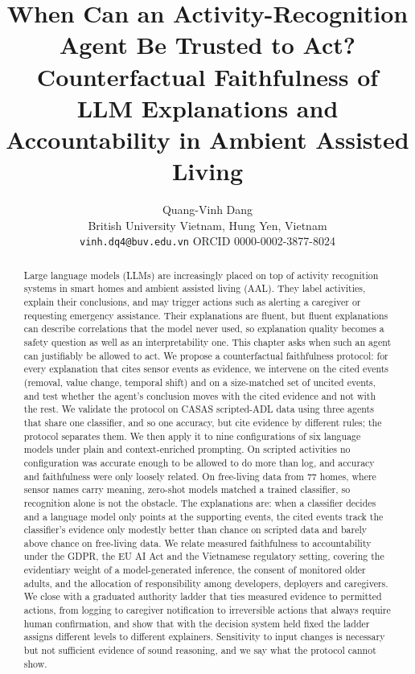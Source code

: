\documentclass[11pt,a4paper]{article}
\title{When Can an Activity-Recognition Agent Be Trusted to Act?\\
Counterfactual Faithfulness of LLM Explanations and\\
Accountability in Ambient Assisted Living}
\author{Quang-Vinh Dang\\
\small British University Vietnam, Hung Yen, Vietnam\\
\small \texttt{vinh.dq4@buv.edu.vn} \quad ORCID 0000-0002-3877-8024}
\date{}
\begin{document}
\maketitle

\begin{abstract}
Large language models (LLMs) are increasingly placed on top of activity recognition systems in smart homes and ambient assisted living (AAL). They label activities, explain their conclusions, and may trigger actions such as alerting a caregiver or requesting emergency assistance. Their explanations are fluent, but fluent explanations can describe correlations that the model never used, so explanation quality becomes a safety question as well as an interpretability one. This chapter asks when such an agent can justifiably be allowed to act. We propose a counterfactual faithfulness protocol: for every explanation that cites sensor events as evidence, we intervene on the cited events (removal, value change, temporal shift) and on a size-matched set of uncited events, and test whether the agent's conclusion moves with the cited evidence and not with the rest. We validate the protocol on CASAS scripted-ADL data using three agents that share one classifier, and so one accuracy, but cite evidence by different rules; the protocol separates them. We then apply it to nine configurations of six language models under plain and context-enriched prompting. On scripted activities no configuration was accurate enough to be allowed to do more than log, and accuracy and faithfulness were only loosely related. On free-living data from 77 homes, where sensor names carry meaning, zero-shot models matched a trained classifier, so recognition alone is not the obstacle. The explanations are: when a classifier decides and a language model only points at the supporting events, the cited events track the classifier's evidence only modestly better than chance on scripted data and barely above chance on free-living data. We relate measured faithfulness to accountability under the GDPR, the EU AI Act and the Vietnamese regulatory setting, covering the evidentiary weight of a model-generated inference, the consent of monitored older adults, and the allocation of responsibility among developers, deployers and caregivers. We close with a graduated authority ladder that ties measured evidence to permitted actions, from logging to caregiver notification to irreversible actions that always require human confirmation, and show that with the decision system held fixed the ladder assigns different levels to different explainers. Sensitivity to input changes is necessary but not sufficient evidence of sound reasoning, and we say what the protocol cannot show.
\end{abstract}
\end{document}
